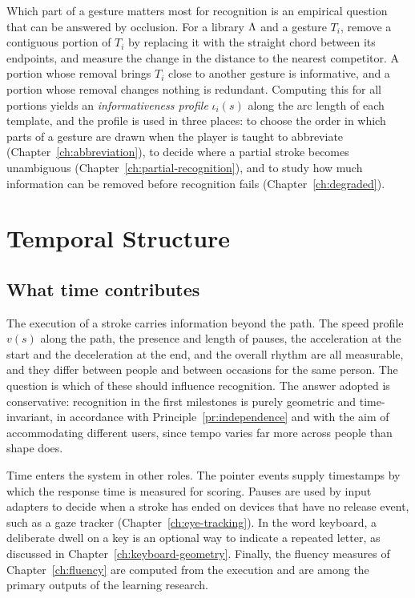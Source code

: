 Which part of a gesture matters most for recognition is an empirical question that can be answered by occlusion. For a library $\Lambda$ and a gesture $T_i$, remove a contiguous portion of $T_i$ by replacing it with the straight chord between its endpoints, and measure the change in the distance to the nearest competitor. A portion whose removal brings $T_i$ close to another gesture is informative, and a portion whose removal changes nothing is redundant. Computing this for all portions yields an \emph{informativeness profile} $\iota_i(s)$ along the arc length of each template, and the profile is used in three places: to choose the order in which parts of a gesture are drawn when the player is taught to abbreviate (Chapter~\ref{ch:abbreviation}), to decide where a partial stroke becomes unambiguous (Chapter~\ref{ch:partial-recognition}), and to study how much information can be removed before recognition fails (Chapter~\ref{ch:degraded}).

\chapter{Temporal Structure}\label{ch:temporal}

\section{What time contributes}

The execution of a stroke carries information beyond the path. The speed profile $v(s)$ along the path, the presence and length of pauses, the acceleration at the start and the deceleration at the end, and the overall rhythm are all measurable, and they differ between people and between occasions for the same person. The question is which of these should influence recognition. The answer adopted is conservative: recognition in the first milestones is purely geometric and time-invariant, in accordance with Principle~\ref{pr:independence} and with the aim of accommodating different users, since tempo varies far more across people than shape does.

Time enters the system in other roles. The pointer events supply timestamps by which the response time is measured for scoring. Pauses are used by input adapters to decide when a stroke has ended on devices that have no release event, such as a gaze tracker (Chapter~\ref{ch:eye-tracking}). In the word keyboard, a deliberate dwell on a key is an optional way to indicate a repeated letter, as discussed in Chapter~\ref{ch:keyboard-geometry}. Finally, the fluency measures of Chapter~\ref{ch:fluency} are computed from the execution and are among the primary outputs of the learning research.

